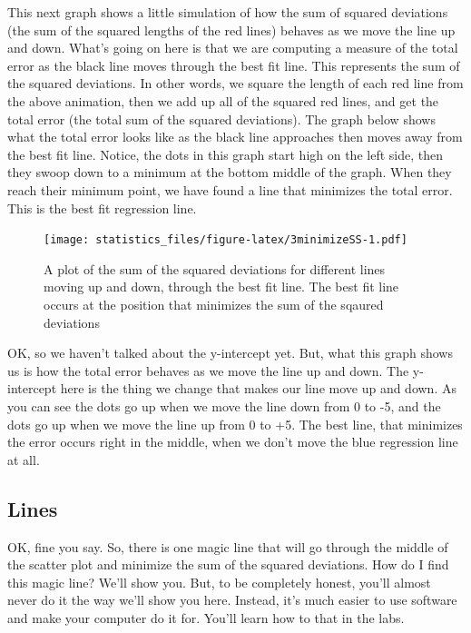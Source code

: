 \documentclass[]{book}
\begin{document}
This next graph shows a little simulation of how the sum of squared deviations (the sum of the squared lengths of the red lines) behaves as we move the line up and down. What's going on here is that we are computing a measure of the total error as the black line moves through the best fit line. This represents the sum of the squared deviations. In other words, we square the length of each red line from the above animation, then we add up all of the squared red lines, and get the total error (the total sum of the squared deviations). The graph below shows what the total error looks like as the black line approaches then moves away from the best fit line. Notice, the dots in this graph start high on the left side, then they swoop down to a minimum at the bottom middle of the graph. When they reach their minimum point, we have found a line that minimizes the total error. This is the best fit regression line.

\begin{figure}
\centering
\texttt{[image: statistics\_files/figure-latex/3minimizeSS-1.pdf]}
\caption{\label{fig:3minimizeSS}A plot of the sum of the squared deviations for different lines moving up and down, through the best fit line. The best fit line occurs at the position that minimizes the sum of the sqaured deviations}
\end{figure}

OK, so we haven't talked about the y-intercept yet. But, what this graph shows us is how the total error behaves as we move the line up and down. The y-intercept here is the thing we change that makes our line move up and down. As you can see the dots go up when we move the line down from 0 to -5, and the dots go up when we move the line up from 0 to +5. The best line, that minimizes the error occurs right in the middle, when we don't move the blue regression line at all.

\hypertarget{lines}{%
\subsection{Lines}\label{lines}}

OK, fine you say. So, there is one magic line that will go through the middle of the scatter plot and minimize the sum of the squared deviations. How do I find this magic line? We'll show you. But, to be completely honest, you'll almost never do it the way we'll show you here. Instead, it's much easier to use software and make your computer do it for. You'll learn how to that in the labs.
\end{document}
